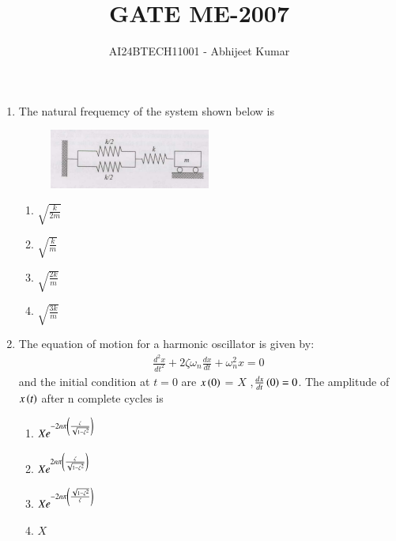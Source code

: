 \documentclass[journal]{IEEEtran}
\begin{document}

\vspace{3cm}


\renewcommand{\thefigure}{\theenumi}
\renewcommand{\thetable}{\theenumi}
\setlength{\intextsep}{10pt} %


\renewcommand{\thetable}{\theenumi}

\title{GATE ME-2007}
\author{AI24BTECH11001 - Abhijeet Kumar
}
\maketitle
\renewcommand{\thefigure}{\theenumi}
\renewcommand{\thetable}{\theenumi}

\begin{enumerate}[start = 52]
    \item The natural frequemcy of the system shown below is
    \begin{figure}[h]
    \centering
    \includegraphics[width=0.5\textwidth]{fig1.png}  
    \end{figure}

    \begin{multicols}{4}
        \begin{enumerate}
            \item $\sqrt{\frac{k}{2m}}$
            \item $\sqrt{\frac{k}{m}}$
            \item $\sqrt{\frac{2k}{m}}$
            \item $\sqrt{\frac{3k}{m}}$
        \end{enumerate}
    \end{multicols}

    \item The equation of motion for a harmonic oscillator is given by:
    \begin{align*}
    {\frac{d^2 x}{dt^2}} + 2\zeta \omega_n \frac{dx}{dt} + \omega_n^2 x = 0
    \end{align*}
    and the initial condition at $t = 0$ are $x\left(0\right)$ = $X$ ,$ \frac{dx}{dt}\left(0\right) = 0$. The amplitude of $x\left(t\right)$ after n complete cycles is
    \begin{multicols}{2}
    \begin{enumerate}
        \item $X e^{-2n\pi \left(\frac{\zeta}{\sqrt{1 - \zeta^2}}\right)}$
        \item $X e^{2n\pi \left(\frac{\zeta}{\sqrt{1 - \zeta^2}}\right)}$
        \item $X e^{-2n\pi \left(\frac{\sqrt{1 - \zeta^2}}{\zeta}\right)}$
        \item $X$
    \end{enumerate}
    \end{multicols}


\end{enumerate}
\end{document}

